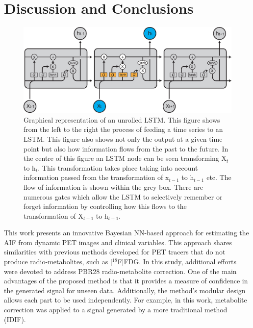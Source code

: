     \section{Discussion and Conclusions} \label{sec:a_bayesian_neural_network-based_method_for_the_extraction_of_a_metabolite_corrected_arterial_input_function_from_dynamic_pbr28_pet_appendix_discussion_and_conclusions}
        \begin{figure}
            \centering
            
            \includegraphics[width=1.0\linewidth]{figures/background_lstm.png}
            
            \captionsetup{singlelinecheck=false}
            \caption{
                Graphical representation of an unrolled \gls{LSTM}. This figure shows from the left to the right the process of feeding a time series to an \gls{LSTM}. This figure also shows not only the output at a given time point but also how information flows from the past to the future. In the centre of this figure an \gls{LSTM} node can be seen transforming X$_t$ to h$_t$. This transformation takes place taking into account information passed from the transformation of x$_{t-1}$ to h$_{t-1}$ etc. The flow of information is shown within the grey box. There are numerous gates which allow the \gls{LSTM} to selectively remember or forget information by controlling how this flows to the transformation of X$_{t+1}$ to h$_{t+1}$.
            }
            \label{fig:a_bayesian_neural_network-based_method_for_the_extraction_of_a_metabolite_corrected_arterial_input_function_from_dynamic_pbr28_pet_appendix_results_lstm}
        \end{figure}
       
        This work presents an innovative Bayesian \gls{NN}-based approach for estimating the \gls{AIF} from dynamic \gls{PET} images and clinical variables. This approach shares similarities with previous methods developed for \gls{PET} tracers that do not produce radio-metabolites, such as [$^{18}$F]\gls{FDG}. In this study, additional efforts were devoted to address \gls{PBR28} radio-metabolite correction. One of the main advantages of the proposed method is that it provides a measure of confidence in the generated signal for unseen data. Additionally, the method's modular design allows each part to be used independently. For example, in this work, metabolite correction was applied to a signal generated by a more traditional method (\gls{IDIF}). 
        
